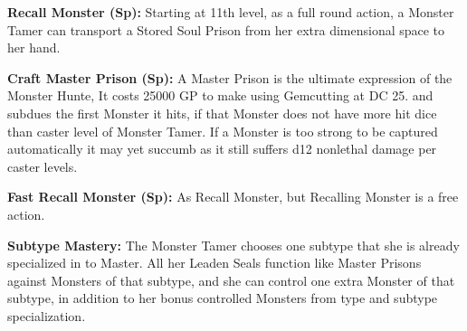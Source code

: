 \textbf{Recall Monster (Sp):} Starting at 11th level, as a full round action, a Monster Tamer can transport a Stored Soul Prison from her extra dimensional space to her hand.

\textbf{Craft Master Prison (Sp):} A Master Prison is the ultimate expression of the Monster Hunte, It costs 25000 GP to make using  Gemcutting at DC 25. and subdues the first Monster it hits, if that Monster does not have more hit dice than caster level of Monster Tamer. If a Monster is too strong to be captured automatically it may yet succumb as it still suffers d12
nonlethal damage per caster levels.

\textbf{Fast Recall Monster (Sp):} As Recall Monster, but Recalling Monster is a free action.

\textbf{Subtype Mastery:} The Monster Tamer chooses one subtype that she is already specialized in to Master. All her Leaden Seals function
like Master Prisons against Monsters of that subtype, and she can control one extra Monster of that subtype, in addition to her bonus controlled Monsters from type and subtype specialization.


